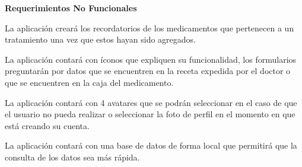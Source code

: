 \textbf{Requerimientos No Funcionales}

	
%

\begin{ReqSist}
	{
		La aplicación creará los recordatorios de los medicamentos que pertenecen a un tratamiento una vez que estos hayan sido agregados.
	}
	{\alta}
	{}{}
\end{ReqSist}


\begin{ReqSist}
	{
		La aplicación contará con íconos que expliquen su funcionalidad, los formularios preguntarán por datos que se encuentren en la receta expedida por el doctor o que se encuentren en la caja del medicamento.
	}
	{\alta}
	{}{}
\end{ReqSist}

\begin{ReqSist}
	{
		La aplicación contará con 4 avatares que se podrán seleccionar en el caso de que el usuario no pueda realizar o seleccionar la foto de perfil en el momento en que está creando su cuenta.
	}
	{\alta}
	{}{}
\end{ReqSist}

\begin{ReqSist}
	{
		La aplicación contará con una base de datos de forma local que permitirá que la consulta de los datos sea más rápida.
	}
	{\alta}
	{}{}
\end{ReqSist}

